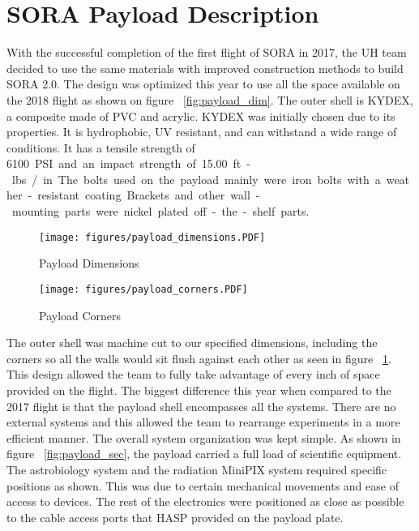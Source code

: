 \newpage
\section{SORA Payload Description}
\label{sec:Hardware}
With the successful completion of the first flight of SORA in 2017, the UH team decided to use the same materials with improved construction methods to build SORA 2.0.  The design was optimized this year to use all the space available on the 2018 flight as shown on figure ~\ref{fig:payload_dim}.   The outer shell is KYDEX, a composite made of PVC and acrylic. KYDEX	 was initially chosen due to its properties.  It is hydrophobic, UV resistant, and can withstand a wide range of conditions.  It has a tensile strength of \SI{6100} PSI and an impact strength of \SI{15.00} ft.-lbs./in.  The bolts used on the payload mainly were iron bolts with a weather-resistant coating.   Brackets and other wall-mounting parts were nickel plated off-the-shelf parts.  
%
\begin{figure}[H]
    \centering
    \begin{minipage}{0.45\textwidth}
        \centering
        \texttt{[image: figures/payload\_dimensions.PDF]} %
        \caption{Payload Dimensions}
        	\label{fig:payload_dim}
    \end{minipage}\hfill
    \begin{minipage}{0.45\textwidth}
        \centering
        \texttt{[image: figures/payload\_corners.PDF]} %
        \caption{Payload Corners}
        	\label{fig:payload_corn}
    \end{minipage}
\end{figure}
%

The outer shell was machine cut to our specified dimensions, including the corners so all the walls would sit flush against each other as seen in figure ~\ref{fig:payload_corn}.  This design allowed the team to fully take advantage of every inch of space provided on the flight.  The biggest difference this year when compared to the 2017 flight is that the payload shell encompasses all the systems.  There are no external systems and this allowed the team to rearrange experiments in a more efficient manner.
The overall system organization was kept simple.  As shown in figure ~\ref{fig:payload_sec}, the payload carried a full load of scientific equipment.  The astrobiology system and the radiation MiniPIX system required specific positions as shown.  This was due to certain mechanical movements and ease of access to devices.  The rest of the electronics were positioned as close as possible to the cable access ports that HASP provided on the payload plate.

